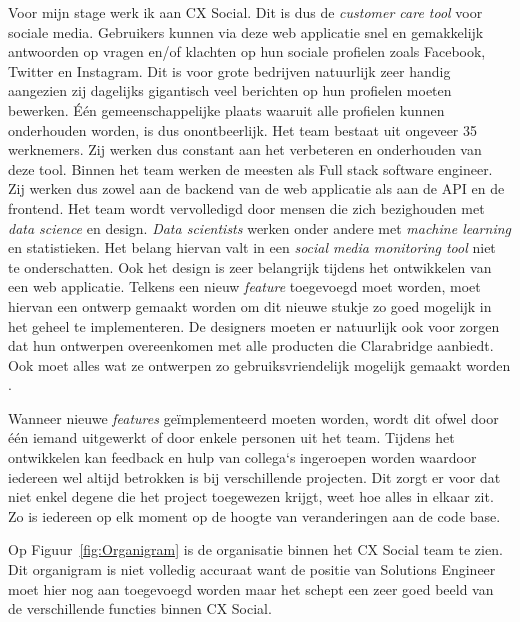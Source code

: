 Voor mijn stage werk ik aan CX Social. Dit is dus de \textit{customer care tool} voor sociale media. Gebruikers kunnen via deze web applicatie snel en gemakkelijk antwoorden op vragen en/of klachten op hun sociale profielen zoals Facebook, Twitter en Instagram. Dit is voor grote bedrijven natuurlijk zeer handig aangezien zij dagelijks gigantisch veel berichten op hun profielen moeten bewerken. \'{E}\'{e}n gemeenschappelijke plaats waaruit alle profielen kunnen onderhouden worden, is dus onontbeerlijk. Het team bestaat uit ongeveer 35 werknemers. Zij werken dus constant aan het verbeteren en onderhouden van deze tool.  Binnen het team werken de meesten als Full stack software engineer. Zij werken dus zowel aan de backend van de web applicatie als aan de API en de frontend. Het team wordt vervolledigd door mensen die zich bezighouden met \textit{data science} en design. \textit{Data scientists} werken onder andere met \textit{machine learning} en statistieken. Het belang hiervan valt in een \textit{social media monitoring tool} niet te onderschatten. Ook het design is zeer belangrijk tijdens het ontwikkelen van een web applicatie. Telkens een nieuw \textit{feature} toegevoegd moet worden, moet hiervan een ontwerp gemaakt worden om dit nieuwe stukje zo goed mogelijk in het geheel te implementeren. De designers moeten er natuurlijk ook voor zorgen dat hun ontwerpen overeenkomen met alle producten die Clarabridge aanbiedt. Ook moet alles wat ze ontwerpen zo gebruiksvriendelijk mogelijk gemaakt worden \cite{EngagorTeam}. 

Wanneer nieuwe \textit{features} ge\"{i}mplementeerd moeten worden, wordt dit ofwel door \'{e}\'{e}n iemand uitgewerkt of door enkele personen uit het team. Tijdens het ontwikkelen kan feedback en hulp van collega`s ingeroepen worden waardoor iedereen wel altijd betrokken is bij verschillende projecten. Dit zorgt er voor dat niet enkel degene die het project toegewezen krijgt, weet hoe alles in elkaar zit.  Zo is iedereen op elk moment op de hoogte van veranderingen aan de code base. 

Op Figuur~\ref{fig:Organigram} is de organisatie binnen het CX Social team te zien. Dit organigram is niet volledig accuraat want de positie van Solutions Engineer moet hier nog aan toegevoegd worden maar het schept een zeer goed beeld van de verschillende functies binnen CX Social. 

